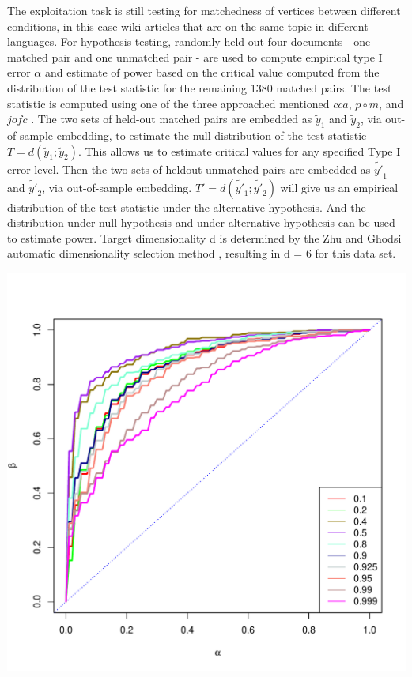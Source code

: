 \documentclass[11pt]{article} %
\begin{document}
The exploitation task is still testing for matchedness of vertices between different conditions, in this case wiki articles that are on the same topic  in  different languages.
For hypothesis testing,   randomly held out four documents - one matched pair and one unmatched pair
 -  are used to compute empirical type I error $\alpha$ and estimate of power based on the critical value computed
  from the distribution of the test statistic for the remaining 1380 matched pairs. 
The test statistic is computed using one of the three approached mentioned  $cca$, $p\circ m$, and $jofc$ . 
The two sets of held-out matched pairs are embedded as $\tilde{y}_1$ and $\tilde{y}_2$, via out-of-sample
embedding, to estimate the null distribution of the test statistic $T = d(\tilde{y}_1; \tilde{y}_2)$. This allows
us to estimate critical values for any specified Type I error level. 
Then the two sets of heldout unmatched pairs are embedded as $\tilde{y'}_1$ and $\tilde{y'}_2$, via out-of-sample embedding. 
$T' = d(\tilde{y'}_1; \tilde{y'}_2)$ will give us an empirical distribution of the test statistic  under the alternative hypothesis. 
And the distribution under null hypothesis and under alternative hypothesis can be used to estimate power.
Target dimensionality d is determined by the Zhu and Ghodsi  automatic dimensionality selection
method \cite{ZhuGhodsi}, resulting in d = 6 for this data set.


\begin{knitrout}
\color{fgcolor}\includegraphics{graphs/FidCommPaperwiki-two-cond-plot} 
\end{knitrout}
\end{document}
